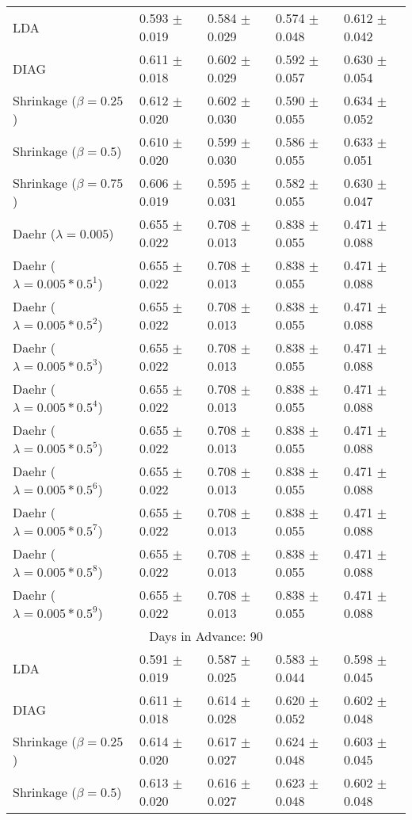 \begin{table}
\begin{tabular}{*{5}{l}}
LDA&0.593 $\pm$ 0.019&0.584 $\pm$ 0.029&0.574 $\pm$ 0.048&0.612 $\pm$ 0.042\\
DIAG&0.611 $\pm$ 0.018&0.602 $\pm$ 0.029&0.592 $\pm$ 0.057&0.630 $\pm$ 0.054\\
Shrinkage ($\beta=0.25$)&0.612 $\pm$ 0.020&0.602 $\pm$ 0.030&0.590 $\pm$ 0.055&0.634 $\pm$ 0.052\\
Shrinkage ($\beta=0.5$)&0.610 $\pm$ 0.020&0.599 $\pm$ 0.030&0.586 $\pm$ 0.055&0.633 $\pm$ 0.051\\
Shrinkage ($\beta=0.75$)&0.606 $\pm$ 0.019&0.595 $\pm$ 0.031&0.582 $\pm$ 0.055&0.630 $\pm$ 0.047\\
Daehr ($\lambda=0.005$)&0.655 $\pm$ 0.022&0.708 $\pm$ 0.013&0.838 $\pm$ 0.055&0.471 $\pm$ 0.088\\
Daehr ($\lambda=0.005*0.5^1$)&0.655 $\pm$ 0.022&0.708 $\pm$ 0.013&0.838 $\pm$ 0.055&0.471 $\pm$ 0.088\\
Daehr ($\lambda=0.005*0.5^2$)&0.655 $\pm$ 0.022&0.708 $\pm$ 0.013&0.838 $\pm$ 0.055&0.471 $\pm$ 0.088\\
Daehr ($\lambda=0.005*0.5^3$)&0.655 $\pm$ 0.022&0.708 $\pm$ 0.013&0.838 $\pm$ 0.055&0.471 $\pm$ 0.088\\
Daehr ($\lambda=0.005*0.5^4$)&0.655 $\pm$ 0.022&0.708 $\pm$ 0.013&0.838 $\pm$ 0.055&0.471 $\pm$ 0.088\\
Daehr ($\lambda=0.005*0.5^5$)&0.655 $\pm$ 0.022&0.708 $\pm$ 0.013&0.838 $\pm$ 0.055&0.471 $\pm$ 0.088\\
Daehr ($\lambda=0.005*0.5^6$)&0.655 $\pm$ 0.022&0.708 $\pm$ 0.013&0.838 $\pm$ 0.055&0.471 $\pm$ 0.088\\
Daehr ($\lambda=0.005*0.5^7$)&0.655 $\pm$ 0.022&0.708 $\pm$ 0.013&0.838 $\pm$ 0.055&0.471 $\pm$ 0.088\\
Daehr ($\lambda=0.005*0.5^8$)&0.655 $\pm$ 0.022&0.708 $\pm$ 0.013&0.838 $\pm$ 0.055&0.471 $\pm$ 0.088\\
Daehr ($\lambda=0.005*0.5^9$)&0.655 $\pm$ 0.022&0.708 $\pm$ 0.013&0.838 $\pm$ 0.055&0.471 $\pm$ 0.088\\
\hline\multicolumn{5}{c}{  Days in Advance: 90}\\\hline
LDA&0.591 $\pm$ 0.019&0.587 $\pm$ 0.025&0.583 $\pm$ 0.044&0.598 $\pm$ 0.045\\
DIAG&0.611 $\pm$ 0.018&0.614 $\pm$ 0.028&0.620 $\pm$ 0.052&0.602 $\pm$ 0.048\\
Shrinkage ($\beta=0.25$)&0.614 $\pm$ 0.020&0.617 $\pm$ 0.027&0.624 $\pm$ 0.048&0.603 $\pm$ 0.045\\
Shrinkage ($\beta=0.5$)&0.613 $\pm$ 0.020&0.616 $\pm$ 0.027&0.623 $\pm$ 0.048&0.602 $\pm$ 0.048\\

\end{tabular}
\end{table}
